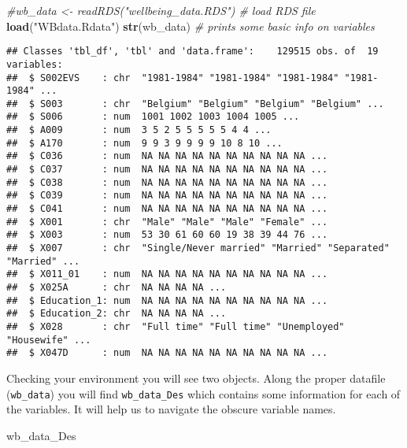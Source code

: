 \documentclass[]{article}
\newenvironment{Shaded}{\begin{snugshade}}{\end{snugshade}}
\newcommand{\KeywordTok}[1]{\textcolor[rgb]{0.13,0.29,0.53}{\textbf{#1}}}
\newcommand{\StringTok}[1]{\textcolor[rgb]{0.31,0.60,0.02}{#1}}
\newcommand{\CommentTok}[1]{\textcolor[rgb]{0.56,0.35,0.01}{\textit{#1}}}
\newcommand{\NormalTok}[1]{#1}
\begin{document}
\begin{Shaded}
\begin{Highlighting}[]
\CommentTok{#wb_data <- readRDS("wellbeing_data.RDS")   # load RDS file}
\KeywordTok{load}\NormalTok{(}\StringTok{"WBdata.Rdata"}\NormalTok{)}
\KeywordTok{str}\NormalTok{(wb_data)  }\CommentTok{# prints some basic info on variables}
\end{Highlighting}
\end{Shaded}

\begin{verbatim}
## Classes 'tbl_df', 'tbl' and 'data.frame':    129515 obs. of  19 variables:
##  $ S002EVS    : chr  "1981-1984" "1981-1984" "1981-1984" "1981-1984" ...
##  $ S003       : chr  "Belgium" "Belgium" "Belgium" "Belgium" ...
##  $ S006       : num  1001 1002 1003 1004 1005 ...
##  $ A009       : num  3 5 2 5 5 5 5 5 4 4 ...
##  $ A170       : num  9 9 3 9 9 9 9 10 8 10 ...
##  $ C036       : num  NA NA NA NA NA NA NA NA NA NA ...
##  $ C037       : num  NA NA NA NA NA NA NA NA NA NA ...
##  $ C038       : num  NA NA NA NA NA NA NA NA NA NA ...
##  $ C039       : num  NA NA NA NA NA NA NA NA NA NA ...
##  $ C041       : num  NA NA NA NA NA NA NA NA NA NA ...
##  $ X001       : chr  "Male" "Male" "Male" "Female" ...
##  $ X003       : num  53 30 61 60 60 19 38 39 44 76 ...
##  $ X007       : chr  "Single/Never married" "Married" "Separated" "Married" ...
##  $ X011_01    : num  NA NA NA NA NA NA NA NA NA NA ...
##  $ X025A      : chr  NA NA NA NA ...
##  $ Education_1: num  NA NA NA NA NA NA NA NA NA NA ...
##  $ Education_2: chr  NA NA NA NA ...
##  $ X028       : chr  "Full time" "Full time" "Unemployed" "Housewife" ...
##  $ X047D      : num  NA NA NA NA NA NA NA NA NA NA ...
\end{verbatim}

Checking your environment you will see two objects. Along the proper
datafile (\texttt{wb\_data}) you will find \texttt{wb\_data\_Des} which
contains some information for each of the variables. It will help us to
navigate the obscure variable names.

\begin{Shaded}
\begin{Highlighting}[]
\NormalTok{wb_data_Des}
\end{Highlighting}
\end{Shaded}
\end{document}
